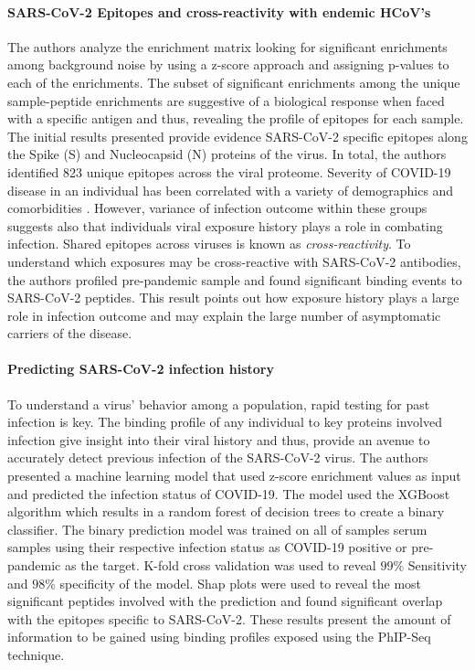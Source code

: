 \documentclass{article}
\begin{document}
\paragraph{SARS-CoV-2 Epitopes and cross-reactivity with endemic HCoV's}
The authors analyze the enrichment matrix looking for significant enrichments among background noise by using a z-score approach and assigning p-values to each of the enrichments.
The subset of significant enrichments among the unique sample-peptide enrichments are suggestive of a biological response when faced with a specific antigen and thus, revealing the profile of epitopes for each sample.
The initial results presented provide evidence SARS-CoV-2 specific epitopes along the Spike (S) and Nucleocapsid (N) proteins of the virus.
In total, the authors identified 823 unique epitopes across the viral proteome.
Severity of COVID-19 disease in an individual has been correlated with a variety of demographics and comorbidities \citep{Yuki2020}.
However, variance of infection outcome within these groups suggests also that individuals viral exposure history plays a role in combating infection.
Shared epitopes across viruses is known as \textit{cross-reactivity}.
To understand which exposures may be cross-reactive with SARS-CoV-2 antibodies, the authors profiled pre-pandemic sample and found significant binding events to SARS-CoV-2 peptides.
This result points out how exposure history plays a large role in infection outcome and may explain the large number of asymptomatic carriers of the disease. 

\paragraph{Predicting SARS-CoV-2 infection history} 
To understand a virus' behavior among a population, rapid testing for past infection is key.
The binding profile of any individual to key proteins involved infection give insight into their viral history and thus, provide an avenue to accurately detect previous infection of the SARS-CoV-2 virus.
The authors presented a machine learning model that used z-score enrichment values as input and predicted the infection status of COVID-19.
The model used the XGBoost algorithm which results in a random forest of decision trees to create a binary classifier.
The binary prediction model was trained on all of samples serum samples using their respective infection status as COVID-19 positive or pre-pandemic as the target.
K-fold cross validation was used to reveal $99\%$ Sensitivity and $98\%$ specificity of the model.
Shap plots were used to reveal the most significant peptides involved with the prediction and found significant overlap with the epitopes specific to SARS-CoV-2.
These results present the amount of information to be gained using binding profiles exposed using the PhIP-Seq technique.
\end{document}
